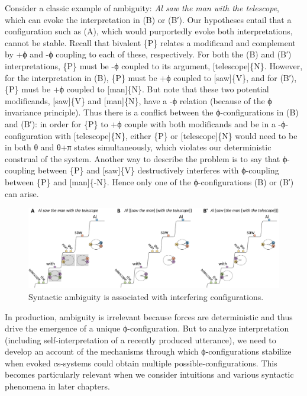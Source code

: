   Consider a classic example of ambiguity: \textit{Al saw the man with the telescope}, which can evoke the interpretation in {}(B) or (B′). Our  hypotheses entail that a configuration such as (A), which would purportedly evoke both interpretations, cannot be stable. Recall that bivalent \{P\} relates a modificand and complement by +ϕ and -ϕ coupling to each of these, respectively. For both the (B) and (B′) interpretations, \{P\} must be -ϕ coupled to its argument, [telescope]\{N\}. However, for the interpretation in (B), \{P\} must be +ϕ coupled to [saw]\{V\}, and for (B′), \{P\} must be +ϕ coupled to [man]\{N\}. But note that these two potential modificands, [saw]\{V\} and [man]\{N\}, have a -ϕ relation (because of the ϕ invariance principle). Thus there is a conflict between the ϕ-con\-fig\-u\-ra\-tions in (B) and (B′): in order for \{P\} to +ϕ couple with both modificands and be in a -ϕ-con\-fig\-u\-ra\-tion with [telescope]\{N\}, either \{P\} or [telescope]\{N\} would need to be in both θ and θ+π states simultaneously, which violates our deterministic construal of the system. Another way to describe the problem is to say that ϕ-coupling between \{P\} and [saw]\{V\} destructively interferes with ϕ-coupling between \{P\} and [man]\{-N\}. Hence only one of the ϕ-con\-fig\-u\-ra\-tions (B) or (B′) can arise.

  
\begin{figure}
\includegraphics[width=\textwidth]{figures/Tilsen-img89.png}
\caption{Syntactic ambiguity is associated with interfering configurations.}
\label{fig:4:39}
\end{figure}
 

  In production, ambiguity is irrelevant because  forces are deterministic and thus drive the emergence of a unique ϕ-con\-fig\-u\-ra\-tion. But to analyze interpretation (including self-interpretation of a recently produced utterance), we need to develop an account of the mechanisms through which ϕ-con\-fig\-u\-ra\-tions stabilize when evoked cs-systems could obtain multiple possible-con\-fig\-u\-ra\-tions. This becomes particularly relevant when we consider  intuitions and various syntactic phenomena in later chapters.

